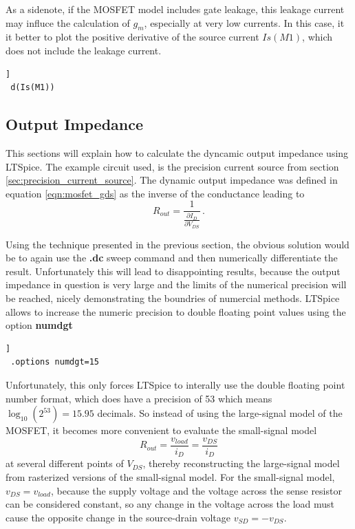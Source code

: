 \documentclass[12pt]{book}
\begin{document}
As a sidenote, if the MOSFET model includes gate leakage, this leakage current may influce the calculation of $g_m$, especially at very low currents. In this case, it it better to plot the positive derivative of the source current $Is(M1)$, which does not include the leakage current.
\begin{lstlisting}[frame=single, xleftmargin=5mm, xrightmargin=5mm, columns=fullflexible, morekeywords={model, dc}, keywordstyle=\bfseries, basicstyle=\rmfamily]]
 d(Is(M1))
\end{lstlisting}

\subsection{Output Impedance}
This sections will explain how to calculate the dyncamic output impedance using LTSpice. The example circuit used, is the precision current source from section \ref{sec:precision_current_source}. The dynamic output impedance was defined in equation \ref{eqn:mosfet_gds} as the inverse of the conductance leading to
\begin{equation*}
    R_{out} = \frac{1}{\frac{\partial I_D}{\partial V_{DS}}} \,.
\end{equation*}

Using the technique presented in the previous section, the obvious solution would be to again use the \textbf{.dc} sweep command and then numerically differentiate the result. Unfortunately this will lead to disappointing results, because the output impedance in question is very large and the limits of the numerical precision will be reached, nicely demonstrating the boundries of numercial methods. LTSpice allows to increase the numeric precision to double floating point values using the option \textbf{numdgt}
\begin{lstlisting}[frame=single, xleftmargin=5mm, xrightmargin=5mm, columns=fullflexible, morekeywords={model, dc, options}, keywordstyle=\bfseries, basicstyle=\rmfamily]]
 .options numdgt=15
\end{lstlisting}
Unfortunately, this only forces LTSpice to interally use the double floating point number format, which does have a precision of \qty{53}{\bit} which means $\log_{10}\left(2^{53}\right) = 15.95$ decimals. So instead of using the large-signal model of the MOSFET, it becomes more convenient to evaluate the small-signal model
\begin{equation*}
    R_{out} = \frac{v_{load}}{i_D} = \frac{v_{DS}}{i_D}
\end{equation*}
at several different points of $V_{DS}$, thereby reconstructing the large-signal model from rasterized versions of the small-signal model. For the small-signal model, $v_{DS} = v_{load}$, because the supply voltage and the voltage across the sense resistor can be considered constant, so any change in the voltage across the load must cause the opposite change in the source-drain voltage $v_{SD} = - v_{DS}$.
\end{document}
